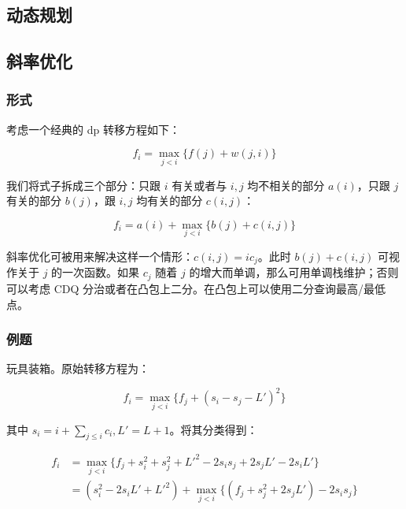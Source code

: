 \documentclass[10pt]{ctexart}
\begin{document}
\newpage

\begin{multicols}{3}
    \setcounter{page}{1}

    \tableofcontents
    
    \section{动态规划}\label{ux52a8ux6001ux89c4ux5212}

    \subsection{斜率优化}\label{ux659cux7387ux4f18ux5316}

    \subsubsection{形式}\label{ux5f62ux5f0f}

    考虑一个经典的 dp 转移方程如下：

    \[f_i = \max_{j < i}\{f(j) + w(j, i)\}\]

    我们将式子拆成三个部分：只跟 \(i\) 有关或者与 \(i,j\) 均不相关的部分
    \(a(i)\)，只跟 \(j\) 有关的部分 \(b(j)\)，跟 \(i,j\) 均有关的部分
    \(c(i,j)\)：

    \[f_{i} = a(i) + \max_{j<i} \{b(j)+c(i,j)\}\]

    斜率优化可被用来解决这样一个情形：\(c(i,j)=ic_j\)。此时
    \(b(j)+c(i,j)\) 可视作关于 \(j\) 的一次函数。如果 \(c_j\) 随着 \(j\)
    的增大而单调，那么可用单调栈维护；否则可以考虑 CDQ
    分治或者在凸包上二分。在凸包上可以使用二分查询最高/最低点。

    \subsubsection{例题}\label{ux4f8bux9898}

    玩具装箱。原始转移方程为：

    \[f_i = \max_{j< i}\{f_j + (s_i-s_j-L')^2\}\]

    其中 \(s_i = i+\sum_{j\le i}c_i, L'=L+1\)。将其分类得到：

    \[
    \begin{aligned}
    f_i &= \max_{j<i}\{f_j+s_i^2+s_j^2+L'^2-2s_is_j+2s_jL'-2s_iL' \} \\
    &= (s_i^2 -2s_iL'+ L'^2) + \max_{j<i}\{(f_j+s_j^2+2s_jL') -2s_is_j \}
    \end{aligned}
    \]


\end{multicols}
\end{document}
